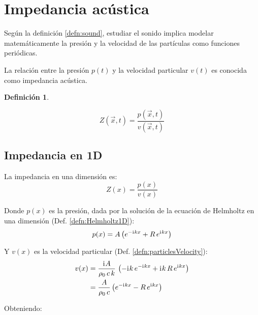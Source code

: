 \documentclass[a5paper,12pt,twoside]{book}
\newtheorem{defn}{{Definición}}[chapter]
\begin{document}
\section{Impedancia acústica}

Según la definición \ref{defn:sound}, estudiar el sonido implica modelar matemáticamente la presión y la velocidad de las partículas como funciones periódicas.

La relación entre la presión $p(t)$ y la velocidad particular $v(t)$ es conocida como impedancia acústica.

\begin{mdframed}[style=MyFrame1]
    \begin{defn}
        \label{defn:impedance}
    \end{defn}
    \begin{equation*}
        Z \left(\Vec{x},t\right) = \frac{p \left(\Vec{x},t\right)}{v \left(\Vec{x},t\right)}
    \end{equation*}
\end{mdframed}


\subsection*{Impedancia en 1D}

La impedancia en una dimensión es:
\begin{equation*}
    Z(x) = \frac{p(x)}{v(x)}
\end{equation*}

Donde $p(x)$ es la presión, dada por la solución de la ecuación de Helmholtz en una dimensión (Def. \ref{defn:Helmholtz1D}):
\begin{equation*}
    p(x) = A \left( e^{-\mathrm{i}\mkern1mu k x} + R \, e^{\mathrm{i}\mkern1mu k x} \right)
\end{equation*}

Y $v(x)$ es la velocidad particular (Def. \ref{defn:particlesVelocity}):
\begin{align}
    v(x) &= \frac{\mathrm{i}\mkern1mu A}{\rho_0 \, c \, k} \, \left( -\mathrm{i}\mkern1mu k \, e^{-\mathrm{i}\mkern1mu k x} + \mathrm{i}\mkern1mu k \, R \, e^{\mathrm{i}\mkern1mu k x} \right)
    \notag
    \\
    &= \frac{A}{\rho_0 \, c} \left( e^{-\mathrm{i}\mkern1mu k x} - R \, e^{\mathrm{i}\mkern1mu k x} \right)
    \label{eqn:particleVel1D}
\end{align}

Obteniendo:
\end{document}
